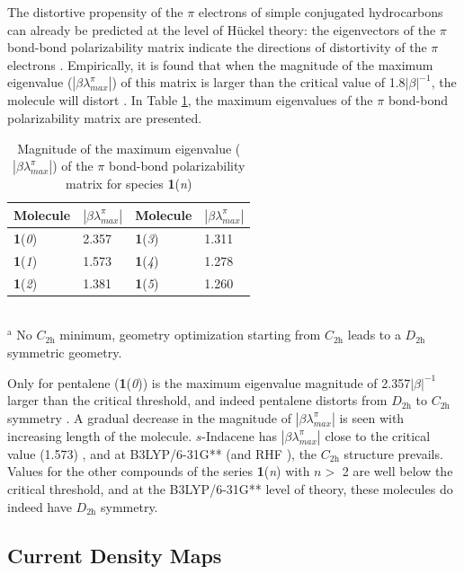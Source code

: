 The distortive propensity of the $\pi$ electrons of simple conjugated hydrocarbons can already be predicted at the level of H\"uckel theory: the eigenvectors of the $\pi$ bond-bond polarizability matrix indicate the directions of distortivity of the $\pi$ electrons  \cite{r08,r17,r29,r30}. Empirically, it is found that when the magnitude of the maximum eigenvalue ($|\beta\lambda^{\pi}_{max}|$) of this matrix is larger than the critical value of 1.8$|\beta|^{-1}$, the molecule will distort  \cite{r17,r29}. In Table \ref{ch7.tab02}, the maximum eigenvalues of the $\pi$ bond-bond polarizability matrix are presented.
\begin{table}[ht]
\caption{Magnitude of the maximum eigenvalue ($|\beta\lambda^{\pi}_{max}|$) of the $\pi$ bond-bond polarizability matrix for species \textbf{1}(\textit{n})}
\begin{center}
\begin{tabular}{l l l l }
\hline
Molecule &
$|\beta\lambda^{\pi}_{max}|$&
Molecule &
$|\beta\lambda^{\pi}_{max}|$\\
\hline
\textbf{1}(\textit{0}) & 2.357 & \textbf{1}(\textit{3}) & 1.311\\
\textbf{1}(\textit{1}) & 1.573 & \textbf{1}(\textit{4}) & 1.278\\
\textbf{1}(\textit{2}) & 1.381 & \textbf{1}(\textit{5}) & 1.260\\
\hline
\end{tabular}
\\
\flushleft
${}^\mathrm{a}$ No $C_\mathrm{2h}$ minimum, geometry optimization starting from $C_\mathrm{2h}$ leads to
a $D_\mathrm{2h}$ symmetric geometry.
\end{center}
\label{ch7.tab02}
\end{table}
Only for pentalene (\textbf{1}(\textit{0})) is the maximum eigenvalue magnitude of 2.357$|\beta|^{-1}$ larger than the critical threshold, and indeed pentalene distorts from $D_\mathrm{2h}$ to $C_\mathrm{2h}$ symmetry  \cite{r16}. A gradual decrease in the magnitude of $|\beta\lambda^{\pi}_{max}|$ is seen with increasing length of the molecule. $s$-Indacene has $|\beta\lambda^{\pi}_{max}|$ close to the critical value (1.573)  \cite{r08}, and at B3LYP/6-31G** (and RHF  \cite{r09}), the $C_\mathrm{2h}$ structure prevails. Values for the other compounds of the series \textbf{1}(\textit{n}) with {$n >$ 2} are well below the critical threshold, and at the B3LYP/6-31G** level of theory, these molecules do indeed have $D_\mathrm{2h}$ symmetry.

\subsection{Current Density Maps}

